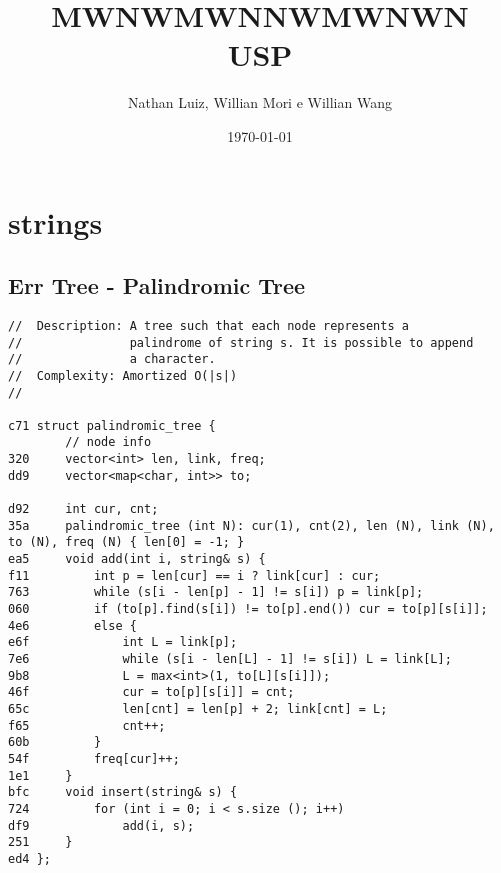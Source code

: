 \documentclass[11pt, a4paper, twoside]{article}
\title{MWNWMWNNWMWNWN \\ USP}
\author{Nathan Luiz, Willian Mori e Willian Wang}
\begin{document}
\twocolumn
\date{\today}
\maketitle


\renewcommand{\contentsname}{Índice} %
\tableofcontents


%
%

\section{strings}

\subsection{ Err Tree - Palindromic Tree}
\begin{lstlisting}
//  Description: A tree such that each node represents a 
//               palindrome of string s. It is possible to append
//               a character.
//  Complexity: Amortized O(|s|)
//

c71 struct palindromic_tree {
        // node info
320     vector<int> len, link, freq;
dd9     vector<map<char, int>> to;
    
d92     int cur, cnt;
35a     palindromic_tree (int N): cur(1), cnt(2), len (N), link (N), to (N), freq (N) { len[0] = -1; }
ea5     void add(int i, string& s) {
f11         int p = len[cur] == i ? link[cur] : cur;
763         while (s[i - len[p] - 1] != s[i]) p = link[p];
060         if (to[p].find(s[i]) != to[p].end()) cur = to[p][s[i]];
4e6         else {
e6f             int L = link[p];
7e6             while (s[i - len[L] - 1] != s[i]) L = link[L];
9b8             L = max<int>(1, to[L][s[i]]);
46f             cur = to[p][s[i]] = cnt;
65c             len[cnt] = len[p] + 2; link[cnt] = L;
f65             cnt++;
60b         }
54f         freq[cur]++;
1e1     }
bfc     void insert(string& s) {
724         for (int i = 0; i < s.size (); i++)
df9             add(i, s);
251     }
ed4 };
\end{lstlisting}
\end{document}
